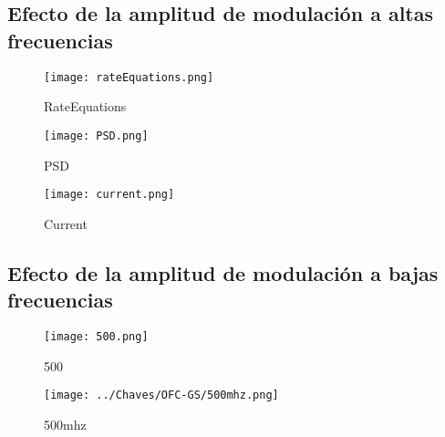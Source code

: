		\subsection{Efecto de la amplitud de modulación a altas frecuencias}

				\begin{figure}[H]
					\centering
					\texttt{[image: rateEquations.png]}
					\caption{\label{Img:rateEquations}RateEquations}	
				\end{figure}

				\begin{figure}[H]
					\centering
					\texttt{[image: PSD.png]}
					\caption{\label{Img:PSD}PSD}	
				\end{figure}

				\begin{figure}[H]
					\centering
					\texttt{[image: current.png]}
					\caption{\label{Img:current}Current}	
				\end{figure}

		\subsection{Efecto de la amplitud de modulación a bajas frecuencias}

				\begin{figure}[H]
					\centering
					\texttt{[image: 500.png]}
					\caption{\label{Img:500}500}	
				\end{figure}

				\begin{figure}[H]
					\centering
					\texttt{[image: ../Chaves/OFC-GS/500mhz.png]}
					\caption{\label{Img:500mhz}500mhz}	
				\end{figure}
